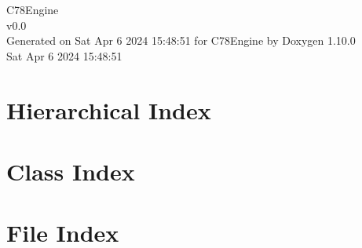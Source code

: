 \documentclass[twoside]{book}
\newcommand{\+}{\discretionary{\mbox{\scriptsize$\hookleftarrow$}}{}{}}
\newcommand{\clearemptydoublepage}{%
    \newpage{\pagestyle{empty}\cleardoublepage}%
  }
\begin{document}
  \raggedbottom
    \hypersetup{pageanchor=false,
                bookmarksnumbered=true,
                pdfencoding=unicode
               }
  \begin{titlepage}
  \vspace*{7cm}
  \begin{center}%
  {\Large C78\+Engine}\\
  [1ex]\large v0.\+0 \\
  \vspace*{1cm}
  {\large Generated on Sat Apr 6 2024 15\+:48\+:51 for C78\+Engine by Doxygen 1.10.0}\\
    \vspace*{0.5cm}
    {\small Sat Apr 6 2024 15:48:51}
  \end{center}
  \end{titlepage}
  \clearemptydoublepage
  \tableofcontents
  \clearemptydoublepage
  \hypersetup{pageanchor=true}
\chapter{Hierarchical Index}

\chapter{Class Index}

\chapter{File Index}

\end{document}
